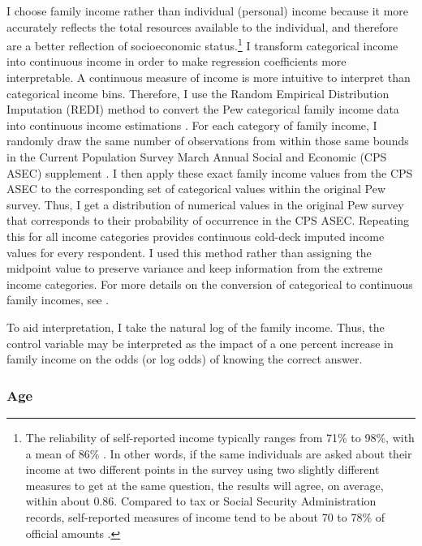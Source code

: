 \documentclass[11pt]{article}
\begin{document}
I choose family income rather than individual (personal) income because it
more accurately reflects the total resources available to the individual, and
therefore are a better reflection of socioeconomic status.\footnote
  {The reliability of self-reported income typically ranges from 71\% to 98\%,
  with a mean of 86\% \citep{Marquis1986}. In other words, if the same
  individuals are asked about their income at two different points in the survey
  using two slightly different measures to get at the same question, the results
  will agree, on average, within about 0.86. Compared to tax or Social Security
  Administration records, self-reported measures of income tend to be about 70
  to 78\% of official amounts \citep{Coder1996, Reardon2011a}.}
I transform categorical income into continuous income in order to make
regression coefficients more interpretable. A continuous measure of income is
more intuitive to interpret than categorical income bins. Therefore, I use the
Random Empirical Distribution Imputation (REDI) method to convert the Pew
categorical family income data into continuous income estimations
\citep{KingREDI}. For each category of family income, I randomly draw the same
number of observations from within those same bounds in the Current Population
Survey March Annual Social and Economic (CPS ASEC) supplement \citep{ASEC2018}.
I then apply these exact family income values from the CPS ASEC to the
corresponding set of categorical values within the original Pew survey. Thus, I
get a distribution of numerical values in the original Pew survey that
corresponds to their probability of occurrence in the CPS ASEC. Repeating this
for all income categories provides continuous cold-deck imputed income values
for every respondent. I used this method rather than assigning the midpoint
value to preserve variance and keep information from the extreme income
categories. For more details on the conversion of categorical to continuous
family incomes, see \citet{KingREDI}.

To aid interpretation, I take the natural log of the family income. Thus, the
control variable may be interpreted as the impact of a one percent increase in
family income on the odds (or log odds) of knowing the correct answer.

\subsubsection{Age}\label{sec:age}
\end{document}
